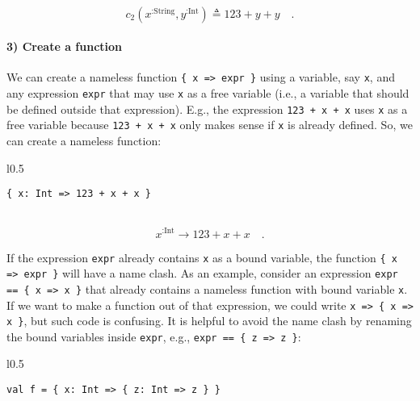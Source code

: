 ~\vspace{-0.35\baselineskip}
\[
c_{2}(x^{:\text{String}},y^{:\text{Int}})\triangleq123+y+y\quad.
\]
\vspace{-0.85\baselineskip}


\paragraph{3) Create a function}

We can create a nameless function \lstinline!{ x => expr }! using
a variable, say \lstinline!x!, and any expression \lstinline!expr!
that may use \lstinline!x! as a free variable
(i.e., a variable that should be defined outside that expression).
E.g., the expression \lstinline!123 + x + x! uses \lstinline!x!
as a free variable because \lstinline!123 + x + x! only makes sense
if \lstinline!x! is already defined. So, we can create a nameless
function:

\begin{wrapfigure}{l}{0.5\columnwidth}%
\vspace{-0.65\baselineskip}
\begin{lstlisting}
{ x: Int => 123 + x + x }
\end{lstlisting}

\vspace{-0.25\baselineskip}
\end{wrapfigure}%

~\vspace{-0.35\baselineskip}
\[
x^{:\text{Int}}\rightarrow123+x+x\quad.
\]
\vspace{-0.85\baselineskip}

If the expression \lstinline!expr! already contains \lstinline!x!
as a bound variable, the function \lstinline!{ x => expr }! will
have a name clash. As an example, consider an expression \lstinline!expr == { x => x }!
that already contains a nameless function with bound variable \lstinline!x!.
If we want to make a function out of that expression, we could write
\lstinline!x => { x => x }!, but such code is confusing. It is helpful
to avoid the name clash by renaming the bound variables inside \lstinline!expr!,
e.g., \lstinline!expr == { z => z }!:

\begin{wrapfigure}{l}{0.5\columnwidth}%
\vspace{-0.65\baselineskip}
\begin{lstlisting}
val f = { x: Int => { z: Int => z } }
\end{lstlisting}

\vspace{-0.25\baselineskip}
\end{wrapfigure}%


